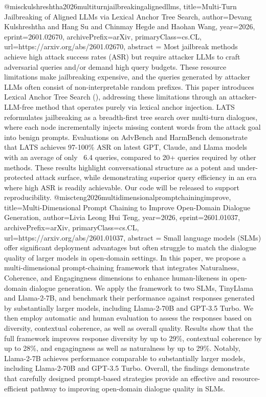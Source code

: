 {}@misc{kulshreshtha2026multiturnjailbreakingalignedllms,
      title={Multi-Turn Jailbreaking of Aligned LLMs via Lexical Anchor Tree Search}, 
      author={Devang Kulshreshtha and Hang Su and Chinmay Hegde and Haohan Wang},
      year={2026},
      eprint={2601.02670},
      archivePrefix={arXiv},
      primaryClass={cs.CL},
      url={https://arxiv.org/abs/2601.02670},
      abstract = {Most jailbreak methods achieve high attack success rates (ASR) but require attacker LLMs to craft adversarial queries and/or demand high query budgets. These resource limitations make jailbreaking expensive, and the queries generated by attacker LLMs often consist of non-interpretable random prefixes. This paper introduces Lexical Anchor Tree Search (), addressing these limitations through an attacker-LLM-free method that operates purely via lexical anchor injection. LATS reformulates jailbreaking as a breadth-first tree search over multi-turn dialogues, where each node incrementally injects missing content words from the attack goal into benign prompts. Evaluations on AdvBench and HarmBench demonstrate that LATS achieves 97-100\% ASR on latest GPT, Claude, and Llama models with an average of only ~6.4 queries, compared to 20+ queries required by other methods. These results highlight conversational structure as a potent and under-protected attack surface, while demonstrating superior query efficiency in an era where high ASR is readily achievable. Our code will be released to support reproducibility.}
}@misc{teng2026multidimensionalpromptchainingimprove,
      title={Multi-Dimensional Prompt Chaining to Improve Open-Domain Dialogue Generation}, 
      author={Livia Leong Hui Teng},
      year={2026},
      eprint={2601.01037},
      archivePrefix={arXiv},
      primaryClass={cs.CL},
      url={https://arxiv.org/abs/2601.01037},
      abstract = {Small language models (SLMs) offer significant deployment advantages but often struggle to match the dialogue quality of larger models in open-domain settings. In this paper, we propose a multi-dimensional prompt-chaining framework that integrates Naturalness, Coherence, and Engagingness dimensions to enhance human-likeness in open-domain dialogue generation. We apply the framework to two SLMs, TinyLlama and Llama-2-7B, and benchmark their performance against responses generated by substantially larger models, including Llama-2-70B and GPT-3.5 Turbo. We then employ automatic and human evaluation to assess the responses based on diversity, contextual coherence, as well as overall quality. Results show that the full framework improves response diversity by up to 29\%, contextual coherence by up to 28\%, and engagingness as well as naturalness by up to 29\%. Notably, Llama-2-7B achieves performance comparable to substantially larger models, including Llama-2-70B and GPT-3.5 Turbo. Overall, the findings demonstrate that carefully designed prompt-based strategies provide an effective and resource-efficient pathway to improving open-domain dialogue quality in SLMs.}
}
